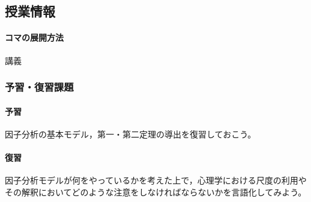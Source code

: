 \subsection{授業情報}
\paragraph{コマの展開方法}
講義
\subsubsection{予習・復習課題}
\paragraph{予習}因子分析の基本モデル，第一・第二定理の導出を復習しておこう。
\paragraph{復習}因子分析モデルが何をやっているかを考えた上で，心理学における尺度の利用やその解釈においてどのような注意をしなければならないかを言語化してみよう。
